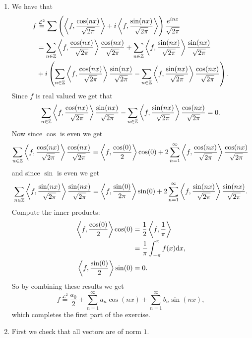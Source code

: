 \documentclass[11pt,a4paper]{article}
\begin{document}
\begin{solution} \phantom{}
  \begin{enumerate}
    \item[(1)] We have that
      \begin{align*}
        f &\overset{\mathcal L^2}{=}
        \sum
        \del{\ip{f}{\frac{\cos(n x)}{\sqrt{2\pi}}} +
        i \ip{f}{\frac{\sin(n x)}{\sqrt{2\pi}}}}
        \frac{e^{i n x}}{\sqrt{2\pi}} \\ &=
        \sum_{n \in \Z} \ip{f}{\frac{\cos(n x)}{\sqrt{2\pi}}}
          \frac{\cos(n x)}{\sqrt{2\pi}} +
        \sum_{n \in \Z} \ip{f}{\frac{\sin(n x)}{\sqrt{2\pi}}}
        \frac{\sin(n x)}{\sqrt{2\pi}} \\ &+ i\del{
          \sum_{n \in \Z} \ip{f}{\frac{\cos(n x)}{\sqrt{2\pi}}}
          \frac{\sin(n x)}{\sqrt{2\pi}} -
        \sum_{n \in \Z} \ip{f}{\frac{\sin(n x)}{\sqrt{2\pi}}}
        \frac{\cos(n x)}{\sqrt{2\pi}}
        }.
      \end{align*}
      Since $f$ is real valued we get that
      \[
        \sum_{n \in \mathbb{Z}} \left\langle f, \frac{\cos(n x)}{\sqrt{2\pi}} \right\rangle
          \frac{\sin(n x)}{\sqrt{2\pi}} -
        \sum_{n \in \mathbb{Z}} \left\langle f, \frac{\sin(n x)}{\sqrt{2\pi}} \right\rangle
          \frac{\cos(n x)}{\sqrt{2\pi}} = 0.
      \]
      Now since $\cos$ is even we get
      \[
        \sum_{n \in \mathbb{Z}} \left\langle f, \frac{\cos(n x)}{\sqrt{2\pi}} \right\rangle
          \frac{\cos(n x)}{\sqrt{2\pi}} =
        \left\langle f, \frac{\cos(0)}{2} \right\rangle \cos(0) +
        2 \sum_{n=1}^{\infty} \left\langle f, \frac{\cos(n x)}{\sqrt{2\pi}} \right\rangle
          \frac{\cos(n x)}{\sqrt{2\pi}}
      \]
      and since $\sin$ is even we get
      \[
        \sum_{n \in \mathbb{Z}} \left\langle f, \frac{\sin(n x)}{\sqrt{2\pi}} \right\rangle
          \frac{\sin(n x)}{\sqrt{2\pi}} =
        \left\langle f, \frac{\sin(0)}{2\pi} \right\rangle \sin(0) + 2\sum_{n=1}^{\infty} \left\langle f, \frac{\sin(n x)}{\sqrt{2\pi}} \right\rangle
          \frac{\sin(n x)}{\sqrt{2\pi}}.
      \]
      Compute the inner products:
      \begin{align*}
        \ip{f}{\frac{\cos(0)}{2}} \cos(0) &= \half \ip{f}{\frac{1}{\pi}} \\ &=
        \frac{1}{\pi} \int_{-\pi}^{\pi} f(x) \dx, \\
        \ip{f}{\frac{\sin(0)}{2}} \sin(0) &= 0.
      \end{align*}
      So by combining these results we get
      \[
        f \overset{\mathcal L^2}{=}
        \frac{a_0}{2} +
        \sum_{n=1}^{\infty} a_n \cos(nx) + \sum_{n=1}^{\infty} b_n \sin(nx),
      \]
      which completes the first part of the exercise.
    \item[(2)] First we check that all vectors are of norm $1$.

\end{enumerate}
\end{solution}
\end{document}
